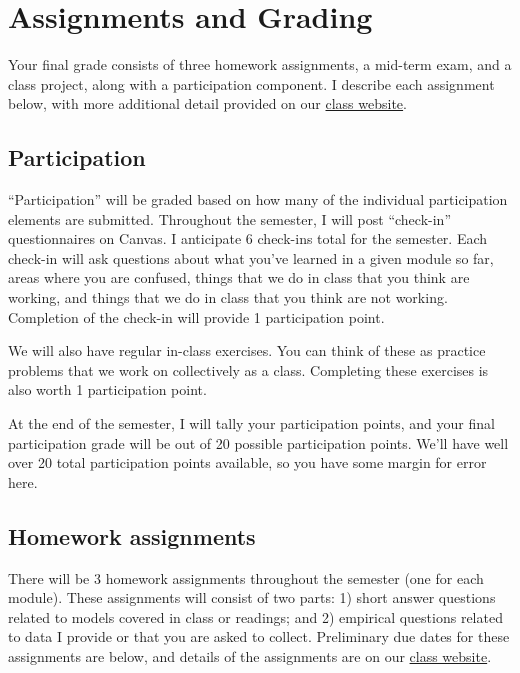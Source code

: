\documentclass[11pt,]{article}
\begin{document}
\hypertarget{assignments-and-grading}{%
\section{Assignments and Grading}\label{assignments-and-grading}}

Your final grade consists of three homework assignments, a mid-term
exam, and a class project, along with a participation component. I
describe each assignment below, with more additional detail provided on
our \href{https://econ372s23.classes.ianmccarthyecon.com/}{class
website}.

\hypertarget{participation}{%
\subsection{Participation}\label{participation}}

``Participation'' will be graded based on how many of the individual
participation elements are submitted. Throughout the semester, I will
post ``check-in'' questionnaires on Canvas. I anticipate 6 check-ins
total for the semester. Each check-in will ask questions about what
you've learned in a given module so far, areas where you are confused,
things that we do in class that you think are working, and things that
we do in class that you think are not working. Completion of the
check-in will provide 1 participation point.

We will also have regular in-class exercises. You can think of these as
practice problems that we work on collectively as a class. Completing
these exercises is also worth 1 participation point.

At the end of the semester, I will tally your participation points, and
your final participation grade will be out of 20 possible participation
points. We'll have well over 20 total participation points available, so
you have some margin for error here.

\hypertarget{homework-assignments}{%
\subsection{Homework assignments}\label{homework-assignments}}

There will be 3 homework assignments throughout the semester (one for
each module). These assignments will consist of two parts: 1) short
answer questions related to models covered in class or readings; and 2)
empirical questions related to data I provide or that you are asked to
collect. Preliminary due dates for these assignments are below, and
details of the assignments are on our
\href{https://econ372s22.classes.ianmccarthyecon.com/}{class website}.
\end{document}
